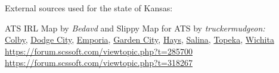 




%
%
%
%
%
%





\vspace{2em}\footnoterule
{\footnotesize \noindent External sources used for the state of Kansas:
\begin{description}[
style=nextline,
leftmargin=1.1em,
labelsep=0pt,
parsep=0pt,
font=\normalfont,
]

\item[$\ast$]
ATS IRL Map by \textit{Bedavd} and Slippy Map for ATS by \textit{truckermudgeon:}\\
\hyperref[city:Colby]{Colby},
\hyperref[city:Dodge City]{Dodge City},
\hyperref[city:Emporia]{Emporia},
\hyperref[city:Garden City]{Garden City},
\hyperref[city:Hays]{Hays},
\hyperref[city:salina_ks]{Salina},
\hyperref[city:Topeka]{Topeka},
\hyperref[city:Wichita]{Wichita}
\\ \url{https://forum.scssoft.com/viewtopic.php?t=285700}
\\ \url{https://forum.scssoft.com/viewtopic.php?t=318267}

\end{description}
}
